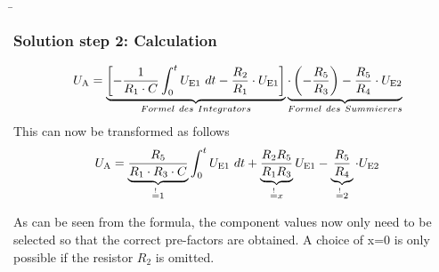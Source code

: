 \begin{frame}
    \b{   
        \frametitle{Solution step 2: Calculation}
       
        \begin{equation}
            U_{\textnormal{A}} = \underbrace{\left[ -\frac{1}{R_1 \cdot C} \int_{0}^{t} U_{\textnormal{E1}}~dt -\frac{R_2}{R_1} \cdot U_{\textnormal{E1}} \right]}_{Formel~des~Integrators} \underbrace{\cdot\left(-\frac{R_5}{R_3}\right)-\frac{R_5}{R_4}\cdot U_{\textnormal{E2}}}_{Formel~des~Summierers} 
        \end{equation}
        This can now be transformed as follows
        \begin{equation}
            U_{\textnormal{A}} = \underbrace{\frac{R_5}{R_1 \cdot R_3 \cdot C}}_{\stackrel{!}{=}1} \int_{0}^{t} U_{\textnormal{E1}}~dt + \underbrace{\frac{R_2 R_5}{R_1 R_3}}_{\stackrel{!}{=}x} U_{\textnormal{E1}} -\underbrace{\frac{R_5}{R_4}}_{\stackrel{!}{=}2} \cdot U_{\textnormal{E2}} 
        \end{equation}

        As can be seen from the formula, the component values now only need to be selected so that the correct pre-factors are obtained.
        A choice of x=0 is only possible if the resistor $R_2$ is omitted.
    }
\end{frame}

